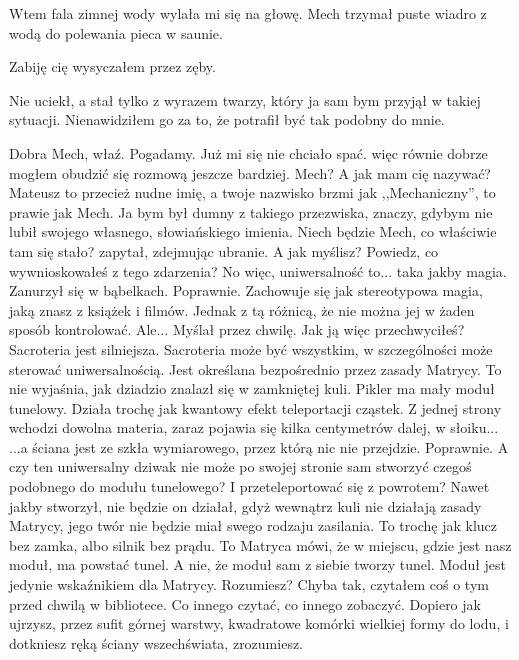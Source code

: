 Wtem fala zimnej wody wylała mi się na głowę. 
Mech trzymał puste wiadro z wodą do polewania pieca w saunie.
\begin{dialogue}
\ds{} Zabiję cię \dm{} wysyczałem przez zęby.
\end{dialogue}
Nie uciekł, a stał tylko z wyrazem twarzy, który ja sam bym przyjął w takiej sytuacji.
Nienawidziłem go za to, że potrafił być tak podobny do mnie.
\begin{dialogue}
\ds{} Dobra Mech, właź. Pogadamy. \dm{} Już mi się nie chciało spać. więc równie dobrze mogłem obudzić się rozmową jeszcze bardziej.
\ds{} Mech?
\ds{} A jak mam cię nazywać? Mateusz to przecież nudne imię, a twoje nazwisko brzmi jak ,,Mechaniczny'', to prawie jak Mech. 
Ja bym był dumny z takiego przezwiska, znaczy, gdybym nie lubił swojego własnego, słowiańskiego imienia.
\ds{} Niech będzie Mech, co właściwie tam się stało? \dm{} zapytał, zdejmując ubranie.
\ds{} A jak myślisz? Powiedz, co wywnioskowałeś z tego zdarzenia?
\ds{} No więc, uniwersalność to... taka jakby magia. \dm{} Zanurzył się w bąbelkach.
\ds{} Poprawnie. Zachowuje się jak stereotypowa magia, jaką znasz z książek i filmów. Jednak z tą różnicą, że nie można jej w żaden sposób kontrolować.
\ds{} Ale... \dm{} Myślał przez chwilę. \dm{} Jak ją więc przechwyciłeś?
\ds{} Sacroteria jest silniejsza. Sacroteria może być wszystkim, w szczególności może sterować uniwersalnością. Jest określana bezpośrednio przez zasady Matrycy.
\ds{} To nie wyjaśnia, jak dziadzio znalazł się w zamkniętej kuli.
\ds{} Pikler ma mały moduł tunelowy. Działa trochę jak kwantowy efekt teleportacji cząstek. Z jednej strony wchodzi dowolna materia, zaraz pojawia się kilka centymetrów dalej, w słoiku...
\ds{} ...a ściana jest ze szkła wymiarowego, przez którą nic nie przejdzie.
\ds{} Poprawnie.
\ds{} A czy ten uniwersalny dziwak nie może po swojej stronie sam stworzyć czegoś podobnego do modułu tunelowego? I przeteleportować się z powrotem?
\ds{} Nawet jakby stworzył, nie będzie on działał, gdyż wewnątrz kuli nie działają zasady Matrycy, jego twór nie będzie miał swego rodzaju zasilania.
To trochę jak klucz bez zamka, albo silnik bez prądu. 
To Matryca mówi, że w miejscu, gdzie jest nasz moduł, ma powstać tunel. A nie, że moduł sam z siebie tworzy tunel. Moduł jest jedynie wskaźnikiem dla Matrycy. Rozumiesz?
\ds{} Chyba tak, czytałem coś o tym przed chwilą w bibliotece.
\ds{} Co innego czytać, co innego zobaczyć. Dopiero jak ujrzysz, przez sufit górnej warstwy, kwadratowe komórki wielkiej formy do lodu, i dotkniesz ręką ściany wszechświata, zrozumiesz.
\end{dialogue}

